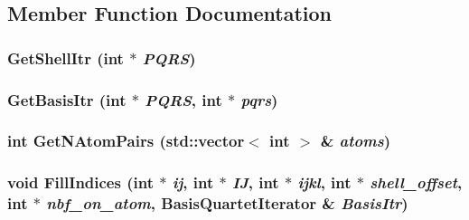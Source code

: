 \subsection{Member Function Documentation}
\hypertarget{classJKBuilder_1_1PsiIntManager_a705edceb221f8e4caf7ddece3fb564a7}{
\subsubsection[{GetShellItr}]{ GetShellItr (int $\ast$ {\em PQRS})}}
\label{classJKBuilder_1_1PsiIntManager_a705edceb221f8e4caf7ddece3fb564a7}
\hypertarget{classJKBuilder_1_1PsiIntManager_a5933bbf29c242bc4ca6bf84fa4114948}{
\subsubsection[{GetBasisItr}]{ GetBasisItr (int $\ast$ {\em PQRS}, \/  int $\ast$ {\em pqrs})}}
\label{classJKBuilder_1_1PsiIntManager_a5933bbf29c242bc4ca6bf84fa4114948}
\hypertarget{classJKBuilder_1_1PsiIntManager_a62c0b160046fddcf57ebcdaba797d50b}{
\subsubsection[{GetNAtomPairs}]{\setlength{\rightskip}{0pt plus 5cm}int GetNAtomPairs (std::vector$<$ int $>$ \& {\em atoms})}}
\label{classJKBuilder_1_1PsiIntManager_a62c0b160046fddcf57ebcdaba797d50b}
\hypertarget{classJKBuilder_1_1PsiIntManager_a8599805b4cb7661e4e0878c6117d71b8}{
\subsubsection[{FillIndices}]{\setlength{\rightskip}{0pt plus 5cm}void FillIndices (int $\ast$ {\em ij}, \/  int $\ast$ {\em IJ}, \/  int $\ast$ {\em ijkl}, \/  int $\ast$ {\em shell\_\-offset}, \/  int $\ast$ {\em nbf\_\-on\_\-atom}, \/  {\bf BasisQuartetIterator} \& {\em BasisItr})}}
\label{classJKBuilder_1_1PsiIntManager_a8599805b4cb7661e4e0878c6117d71b8}



